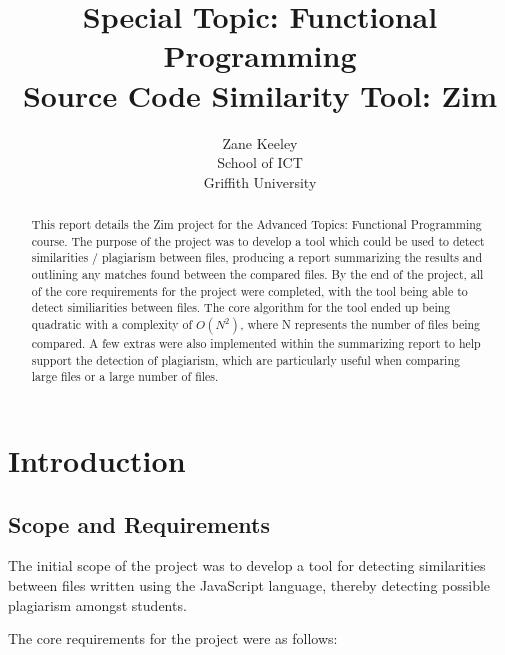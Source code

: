 \documentclass[11pt, a4paper]{article}
\begin{document}
\title{Special Topic: Functional Programming\\
       Source Code Similarity Tool: Zim}

\author{Zane Keeley \\ School of ICT \\ Griffith University}

\maketitle


\tableofcontents

\bigskip

\begin{abstract}
\noindent This report details the Zim project for the Advanced Topics: Functional Programming course. The purpose of the project was to develop a tool which could be used to detect similarities / plagiarism between files, producing a report summarizing the results and outlining any matches found between the compared files.
By the end of the project, all of the core requirements for the project were completed, with the tool being able to detect similiarities between files. The core algorithm for the tool ended up being quadratic with a complexity of \begin{math}O(N^2)\end{math}, where N represents the number of files being compared. 
A few extras were also implemented within the summarizing report to help support the detection of plagiarism, which are particularly useful when comparing large files or a large number of files. 
\end{abstract}

\section{Introduction}

\subsection{Scope and Requirements}

The initial scope of the project was to develop a tool for detecting similarities between files written using the JavaScript language, thereby detecting possible plagiarism amongst students. 

\bigskip

\noindent The core requirements for the project were as follows:
\end{document}

